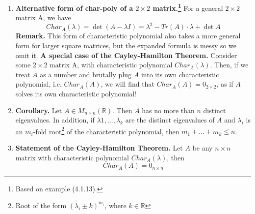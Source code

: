 \documentclass[oneside, 12pt]{book}
\newcommand{\settag}[1]{\renewcommand{\theenumi}{#1}}
\newcommand{\R}{\mathbb{R}}
\newcommand{\tbf}[1]{\textbf{#1}}
\newcommand{\mat}[2]{M_{#1 \times #2}(\R)}
\newcommand{\para}[1]{\item \tbf{#1}}
\begin{document}
\begin{enumerate}
    \settag{4.1.13}
    \para{Alternative form of char-poly of a $2 \times 2$ matrix.\footnote{Based on example (4.1.13).}} For a general $2\times 2$ matrix A, we have
    \begin{equation*}
        Char_A(\lambda)= \det(A-\lambda I) = \lambda^2 - Tr(A)\cdot\lambda + \det{A} 
    \end{equation*}
    \textbf{Remark.} This form of characteristic polynomial also takes a more general form for larger square matrices, but the expanded formula is messy so we omit it. \newline
    \textbf{A special case of the Cayley-Hamilton Theorem.} Consider some $2\times 2$ matrix A, with characteristic polynomial $Char_A(\lambda)$. Then, if we treat $A$ as a number and brutally plug $A$ into its own characteristic polynomial, i.e. $Char_A(A)$, we will find that $Char_A(A) = 0_{2 \times 2}$, as if $A$ solves its own characteristic polynomial!
    
    \settag{4.1.14}
    \para{Corollary.} Let $A\in \mat{n}{n}$. Then $A$ has no more than $n$ distinct eigenvalues. In addition, if $\lambda1,...,\lambda_k$ are the distinct eigenvalues of $A$ and $\lambda_i$ is an $m_i$-fold root\footnote{Root of the form $(\lambda_i \pm k)^{m_i}$, where $k \in \R$} of the characteristic polynomial, then $m_1+...+m_k \leq n$.
    
    \settag{4.1.18}
    \para{Statement of the Cayley-Hamilton Theorem.} Let $A$ be any $n\times n$ matrix with characteristic polynomial $Char_A(\lambda)$, then
    \begin{equation*}
        Char_A(A) = 0_{n \times n}
    \end{equation*}
\end{enumerate}
\end{document}
